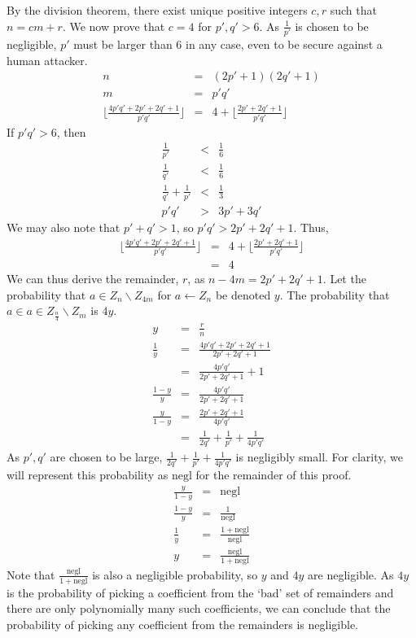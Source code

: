 {By the division theorem, there exist unique positive integers $c,r$
such that $n = cm + r$. We now prove that $c=4$ for $p',q' > 6$. As
$\frac{1}{p'}$ is chosen to be negligible, $p'$ must be larger than
$6$ in any case, even to be secure against a human attacker.
\begin{eqnarray*} %
n & = & (2p'+1)(2q'+1) \\
m & = & p'q' \\
\lfloor \frac{4p'q' +
2p'+2q'+1}{p'q'} \rfloor & = & 4 + \lfloor \frac{2p'+2q'+1}{p'q'}\rfloor
\end{eqnarray*}
If $p'q' > 6$, then
\begin{eqnarray*} %
\frac{1}{p'} & < & \frac{1}{6} \\
\frac{1}{q'} & < & \frac{1}{6} \\
\frac{1}{q'}+\frac{1}{p'} & < & \frac{1}{3} \\
p'q' & > & 3p' + 3q'
\end{eqnarray*}
We may also note that $p' + q' > 1$, so $p'q' > 2p'+2q' + 1$. Thus, 
\begin{eqnarray*} %
\lfloor \frac{4p'q' + 2p'+2q'+1}{p'q'} \rfloor & = & 4 + \lfloor 
          \frac{2p'+2q'+1}{p'q'} \rfloor \\
    & = & 4
\end{eqnarray*}
We can thus derive the remainder, $r$, as $n-4m = 2p'+2q'+1$. Let the
probability that $a\in Z_{n}\backslash Z_{4m}$ for $a \leftarrow Z_n$
be denoted $y$. The probability that $a\in a\in
Z_{{\frac{n}{4}}}\backslash Z_{m}$ is $4y$.
\begin{eqnarray*} %
y & = & \frac{r}{n} \\
\frac{1}{y} & = & \frac{4p'q'+2p'+2q'+1}{2p'+2q'+1} \\
    & = & \frac{4p'q'}{2p'+2q'+1} + 1 \\
\frac{1-y}{y} & = & \frac{4p'q'}{2p'+2q'+1} \\
\frac{y}{1-y} & = & \frac{2p'+2q'+1}{4p'q'} \\
    & = & \frac{1}{2q'} + \frac{1}{p'} + \frac{1}{4p'q'}
\end{eqnarray*}
As $p',q'$ are chosen to be large, $\frac{1}{2q'} + \frac{1}{p'} +
\frac{1}{4p'q'}$ is negligibly small. For clarity, we will represent
this probability as $\mbox{negl}$ for the remainder of this proof.
\begin{eqnarray*} %
\frac{y}{1-y} & = & \mbox{negl} \\
\frac{1-y}{y} & = & \frac{1}{\mbox{negl}} \\
\frac{1}{y} & = & \frac{1+\mbox{negl}}{\mbox{negl}} \\
y & = & \frac{\mbox{negl}}{1 + \mbox{negl}}
\end{eqnarray*}
Note that $\frac{\mbox{negl}}{1 + \mbox{negl}}$ is also a negligible
probability, so $y$ and $4y$ are negligible. As $4y$ is the probability of
picking a coefficient from the `bad' set of remainders and there are
only polynomially many such coefficients, we can conclude that the
probability of picking any coefficient from the remainders is
negligible.

}
